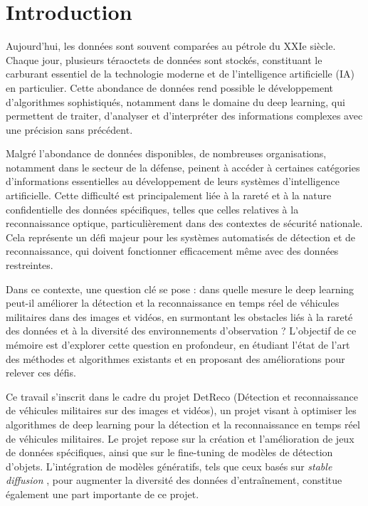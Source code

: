 \chapter{Introduction}
\label{chap:intorduction}
\sloppy

Aujourd’hui, les données sont souvent comparées au pétrole du XXIe siècle.
Chaque jour, plusieurs téraoctets de données sont stockés, constituant le carburant essentiel de la technologie moderne et de l'intelligence artificielle (IA) en particulier.
Cette abondance de données rend possible le développement d'algorithmes sophistiqués, notamment dans le domaine du deep learning, qui permettent de traiter, d'analyser et d'interpréter des informations complexes avec une précision sans précédent.

Malgré l'abondance de données disponibles, de nombreuses organisations, notamment dans le secteur de la défense, peinent à accéder à certaines catégories d'informations essentielles au développement de leurs systèmes d'intelligence artificielle.
Cette difficulté est principalement liée à la rareté et à la nature confidentielle des données spécifiques, telles que celles relatives à la reconnaissance optique, particulièrement dans des contextes de sécurité nationale.
Cela représente un défi majeur pour les systèmes automatisés de détection et de reconnaissance, qui doivent fonctionner efficacement même avec des données restreintes.


Dans ce contexte, une question clé se pose : dans quelle mesure le deep learning peut-il améliorer la détection et la reconnaissance en temps réel de véhicules militaires dans des images et vidéos, en surmontant les obstacles liés à la rareté des données et à la diversité des environnements d'observation ?
L’objectif de ce mémoire est d'explorer cette question en profondeur, en étudiant l’état de l’art des méthodes et algorithmes existants et en proposant des améliorations pour relever ces défis.

Ce travail s’inscrit dans le cadre du projet DetReco (Détection et reconnaissance de véhicules militaires sur des images et vidéos), un projet visant à optimiser les algorithmes de deep learning pour la détection et la reconnaissance en temps réel de véhicules militaires.
Le projet repose sur la création et l’amélioration de jeux de données spécifiques, ainsi que sur le fine-tuning de modèles de détection d’objets.
L'intégration de modèles génératifs, tels que ceux basés sur \textit{stable diffusion} , pour augmenter la diversité des données d'entraînement, constitue également une part importante de ce projet.

